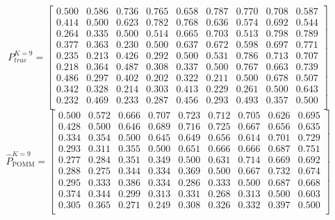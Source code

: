 \documentclass[11pt]{amsart}
\begin{document}
\[
P^{K=9}_{true} = 
\left[\begin{array}{ccccccccc}
0.500 & 0.586 & 0.736 & 0.765 & 0.658 & 0.787 & 0.770 & 0.708 & 0.587 \\
0.414 & 0.500 & 0.623 & 0.782 & 0.768 & 0.636 & 0.574 & 0.692 & 0.544 \\
0.264 & 0.335 & 0.500 & 0.514 & 0.665 & 0.703 & 0.513 & 0.798 & 0.789 \\
0.377 & 0.363 & 0.230 & 0.500 & 0.637 & 0.672 & 0.598 & 0.697 & 0.771 \\
0.235 & 0.213 & 0.426 & 0.292 & 0.500 & 0.531 & 0.786 & 0.713 & 0.707 \\
0.218 & 0.364 & 0.487 & 0.308 & 0.337 & 0.500 & 0.767 & 0.663 & 0.739 \\
0.486 & 0.297 & 0.402 & 0.202 & 0.322 & 0.211 & 0.500 & 0.678 & 0.507 \\
0.342 & 0.328 & 0.214 & 0.303 & 0.413 & 0.229 & 0.261 & 0.500 & 0.643 \\
0.232 & 0.469 & 0.233 & 0.287 & 0.456 & 0.293 & 0.493 & 0.357 & 0.500 \\\end{array}\right] 
\]
\[ 
\hat{P}^{K=9}_{\text{POMM}} = 
\left[\begin{array}{ccccccccc}
0.500 & 0.572 & 0.666 & 0.707 & 0.723 & 0.712 & 0.705 & 0.626 & 0.695 \\
0.428 & 0.500 & 0.646 & 0.689 & 0.716 & 0.725 & 0.667 & 0.656 & 0.635 \\
0.334 & 0.354 & 0.500 & 0.645 & 0.649 & 0.656 & 0.614 & 0.701 & 0.729 \\
0.293 & 0.311 & 0.355 & 0.500 & 0.651 & 0.666 & 0.666 & 0.687 & 0.751 \\
0.277 & 0.284 & 0.351 & 0.349 & 0.500 & 0.631 & 0.714 & 0.669 & 0.692 \\
0.288 & 0.275 & 0.344 & 0.334 & 0.369 & 0.500 & 0.667 & 0.732 & 0.674 \\
0.295 & 0.333 & 0.386 & 0.334 & 0.286 & 0.333 & 0.500 & 0.687 & 0.668 \\
0.374 & 0.344 & 0.299 & 0.313 & 0.331 & 0.268 & 0.313 & 0.500 & 0.603 \\
0.305 & 0.365 & 0.271 & 0.249 & 0.308 & 0.326 & 0.332 & 0.397 & 0.500 \\\end{array}\right] 
\]
\end{document}
